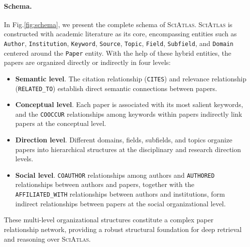 \documentclass{llmxive}
\providecommand{\ours}{\textsc{SciAtlas}}
\begin{document}
\paragraph{Schema.}
In Fig.\ref{fig:schema}, we present the complete schema of {\ours}.
{\ours} is constructed with academic literature as its core, encompassing entities such as \texttt{Author}, \texttt{Institution}, \texttt{Keyword}, \texttt{Source}, \texttt{Topic}, \texttt{Field}, \texttt{Subfield}, and \texttt{Domain} centered around the \texttt{Paper} entity.
With the help of these hybrid entities, the papers are organized directly or indirectly in four levels:
\begin{itemize}[itemsep=1.5ex]
    \item \textbf{Semantic level}. The citation relationship (\texttt{CITES}) and relevance relationship (\texttt{RELATED\_TO}) establish direct semantic connections between papers.
    \item \textbf{Conceptual level}. Each paper is associated with its most salient keywords, and the \texttt{COOCCUR} relationships among keywords within papers indirectly link papers at the conceptual level.
    \item \textbf{Direction level}. Different domains, fields, subfields, and topics organize papers into hierarchical structures at the disciplinary and research direction levels.
    \item \textbf{Social level}. \texttt{COAUTHOR} relationships among authors and \texttt{AUTHORED} relationships between authors and papers, together with the \texttt{AFFILIATED\_WITH} relationships between authors and institutions, form indirect relationships between papers at the social organizational level.
\end{itemize}
These multi-level organizational structures constitute a complex paper relationship network, providing a robust structural foundation for deep retrieval and reasoning over {\ours}.
\end{document}
